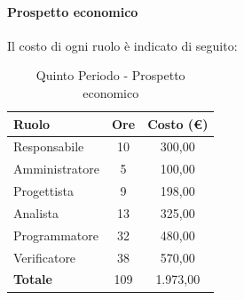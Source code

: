 \documentclass[../PianoDiProgetto_v3.0.0.tex]{subfiles}
\begin{document}
			\newpage
			\paragraph{Prospetto economico}
			Il costo di ogni ruolo è indicato di seguito:
			\begin{table}[h]
				\centering
				\begin{tabular}{l * {2}{c}}
				\toprule
				\textbf{Ruolo} & \textbf{Ore} & \textbf{Costo (\euro{})} \\
				\midrule
				Responsabile & 10 & 300,00 \\
				Amministratore & 5 & 100,00 \\
				Progettista & 9 & 198,00 \\
				Analista & 13 & 325,00 \\		
				Programmatore & 32 & 480,00 \\		
				Verificatore & 38 & 570,00 \\				
				\midrule		
				\textbf{Totale} & 109 & 1.973,00 \\
				\bottomrule	
				\end{tabular}
				\caption{Quinto Periodo - Prospetto economico}		
			\end{table}
			
\end{document}
